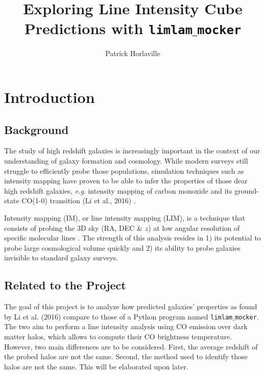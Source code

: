 \documentclass[apj]{emulateapj}
\begin{document}
\title{Exploring Line Intensity Cube Predictions with \MakeLowercase{\texttt{limlam$\_$mocker}}}
 
\author{Patrick Horlaville}
 



\section{Introduction}
\label{sec:intro}
\subsection{Background}
The study of high redshift galaxies is increasingly important in the context of our understanding of galaxy formation and cosmology. While modern surveys still struggle to efficiently probe those populations, simulation techniques such as intensity mapping have proven to be able to infer the properties of those dear high redshift galaxies, \textit{e.g}. intensity mapping of carbon monoxide and its ground-state CO(1-0) transition (Li et al., 2016) \cite{Li_2016}.

Intensity mapping (IM), or line intensity mapping (LIM), is a technique that consists of probing the 3D sky (RA, DEC \& $z$) at low angular resolution of specific molecular lines \cite{Karkare}. The strength of this analysis resides in 1) its potential to probe large cosmological volume quickly and 2) its ability to probe galaxies invisible to standard galaxy surveys. 

\subsection{Related to the Project}

The goal of this project is to analyze how predicted galaxies' properties as found by Li et al. (2016) \cite{Li_2016} compare to those of a Python program named \texttt{limlam$\_$mocker}. The two aim to perform a line intensity analysis using CO emission over dark matter halos, which allows to compute their CO brightness temperature. However, two main differences are to be considered. First, the average redshift of the probed halos are not the same. Second, the method used to identify those halos are not the same. This will be elaborated upon later.
\end{document}
